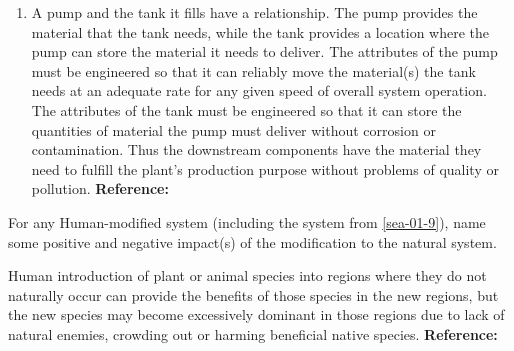 \begin{exercises}
\begin{solution}
\begin{enumerate}[label=\alph*)]
            \item A pump and the tank it fills have a relationship. The pump provides the material that the tank needs, while the tank provides a location where the pump can store the material it needs to deliver. The attributes of the pump must be engineered so that it can reliably move the material(s) the tank needs at an adequate rate for any given speed of overall system operation. The attributes of the tank must be engineered so that it can store the quantities of material the pump must deliver without corrosion or contamination. Thus the downstream components have the material they need to fulfill the plant’s production purpose without problems of quality or pollution. \textbf{Reference:} 
        \end{enumerate}
    \end{solution}
    
    \begin{exercise} 
    \label{sea-01-14}
        For any Human-modified system (including the system from \ref{sea-01-9}), name some positive and negative impact(s) of the modification to the natural system.
    \end{exercise}
    \begin{solution}
        Human introduction of plant or animal species into regions where they do not naturally occur can provide the benefits of those species in the new regions, but the new species may become excessively dominant in those regions due to lack of natural enemies, crowding out or harming beneficial native species. \textbf{Reference:}
    \end{solution}
    

\end{exercises}
